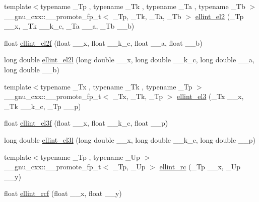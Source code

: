 \begin{DoxyCompactItemize}
\item 
{\footnotesize template$<$typename \+\_\+\+Tp , typename \+\_\+\+Tk , typename \+\_\+\+Ta , typename \+\_\+\+Tb $>$ }\\\+\_\+\+\_\+gnu\+\_\+cxx\+::\+\_\+\+\_\+promote\+\_\+fp\+\_\+t$<$ \+\_\+\+Tp, \+\_\+\+Tk, \+\_\+\+Ta, \+\_\+\+Tb $>$ \hyperlink{group__gnu__math__spec__func_ga43159d9468e4e31a0fbe391561f195be}{ellint\+\_\+el2} (\+\_\+\+Tp \+\_\+\+\_\+x, \+\_\+\+Tk \+\_\+\+\_\+k\+\_\+c, \+\_\+\+Ta \+\_\+\+\_\+a, \+\_\+\+Tb \+\_\+\+\_\+b)
\item 
float \hyperlink{group__gnu__math__spec__func_ga0bf7469fe7ac92e9a2ffa0f92ea62248}{ellint\+\_\+el2f} (float \+\_\+\+\_\+x, float \+\_\+\+\_\+k\+\_\+c, float \+\_\+\+\_\+a, float \+\_\+\+\_\+b)
\item 
long double \hyperlink{group__gnu__math__spec__func_ga491439a09e6000659444f52dc3c9f215}{ellint\+\_\+el2l} (long double \+\_\+\+\_\+x, long double \+\_\+\+\_\+k\+\_\+c, long double \+\_\+\+\_\+a, long double \+\_\+\+\_\+b)
\item 
{\footnotesize template$<$typename \+\_\+\+Tx , typename \+\_\+\+Tk , typename \+\_\+\+Tp $>$ }\\\+\_\+\+\_\+gnu\+\_\+cxx\+::\+\_\+\+\_\+promote\+\_\+fp\+\_\+t$<$ \+\_\+\+Tx, \+\_\+\+Tk, \+\_\+\+Tp $>$ \hyperlink{group__gnu__math__spec__func_ga57b418ec87f207cdd1c9e5fa48b29333}{ellint\+\_\+el3} (\+\_\+\+Tx \+\_\+\+\_\+x, \+\_\+\+Tk \+\_\+\+\_\+k\+\_\+c, \+\_\+\+Tp \+\_\+\+\_\+p)
\item 
float \hyperlink{group__gnu__math__spec__func_ga66131a8ecc14b5228a73a01121f60a35}{ellint\+\_\+el3f} (float \+\_\+\+\_\+x, float \+\_\+\+\_\+k\+\_\+c, float \+\_\+\+\_\+p)
\item 
long double \hyperlink{group__gnu__math__spec__func_ga0d90e66f799a2ebe4bec43eef0d53355}{ellint\+\_\+el3l} (long double \+\_\+\+\_\+x, long double \+\_\+\+\_\+k\+\_\+c, long double \+\_\+\+\_\+p)
\item 
{\footnotesize template$<$typename \+\_\+\+Tp , typename \+\_\+\+Up $>$ }\\\+\_\+\+\_\+gnu\+\_\+cxx\+::\+\_\+\+\_\+promote\+\_\+fp\+\_\+t$<$ \+\_\+\+Tp, \+\_\+\+Up $>$ \hyperlink{group__gnu__math__spec__func_ga21b90daf6c8d705b052304905809d2db}{ellint\+\_\+rc} (\+\_\+\+Tp \+\_\+\+\_\+x, \+\_\+\+Up \+\_\+\+\_\+y)
\item 
float \hyperlink{group__gnu__math__spec__func_gaad5316092224ec3d92b66e79ef266adf}{ellint\+\_\+rcf} (float \+\_\+\+\_\+x, float \+\_\+\+\_\+y)
\item 

\end{DoxyCompactItemize}
